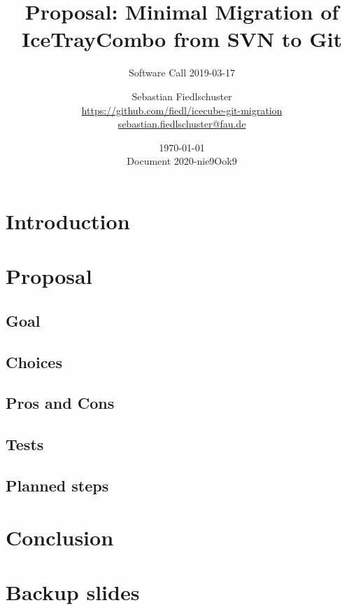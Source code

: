 \documentclass[green, 12pt]{beamer}
\title[Proposal: Minimal Migration of IceTrayCombo from SVN to Git, \url{https://github.com/fiedl/icecube-git-migration/issues/9}]{Proposal: Minimal Migration of IceTrayCombo from SVN to Git}
\subtitle{Software Call 2019-03-17}
\date{\today \\ \vspace*{2mm} \tiny{Document 2020-nie9Ook9} \normalsize}
\author[Sebastian Fiedlschuster]{Sebastian Fiedlschuster \\ \small\url{https://github.com/fiedl/icecube-git-migration} \\
\small\url{sebastian.fiedlschuster@fau.de}}
\institute{Erlangen Centre for Astroparticle Physics}
\newif\ifplacelogo %
\begin{document}



\placelogofalse

\newcommand\done{\checkmark\xspace}
\newcommand\inprogress{$\Rightarrow$\xspace}
\newcommand\tobedone{$\square$\xspace}

\newcommand\question[1]{\colorbox{blue!10}{\fbox{\ \ \questionicon \ \ #1}}}

\section{Introduction}



\section{Proposal}
\subsection{Goal}
\subsection{Choices}
\subsection{Pros and Cons}

\subsection{Tests}

\subsection{Planned steps}




\section{Conclusion}



\appendix
\section{Backup slides}




\end{document}
